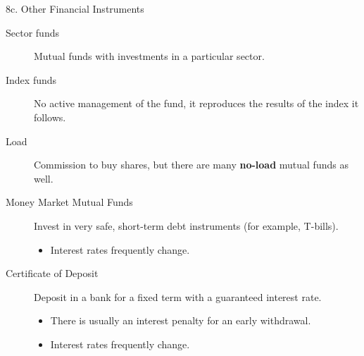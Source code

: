 \begin{CHPT_SUMM_AUTO}[label = {L.-8c}]{8c. Other Financial Instruments}
\begin{description}
	\item[Sector funds]	Mutual funds with investments in a particular sector.
	\item[Index funds]	No active management of the fund, it reproduces the results of the index it follows.
	\item[Load]	Commission to buy shares, but there are many \textbf{no-load} mutual funds as well.
	\item[Money Market Mutual Funds]	Invest in very safe, short-term debt instruments (for example, T-bills).
		\begin{itemize}[leftmargin = *]
		\item	Interest rates frequently change.
		\end{itemize}
	\item[Certificate of Deposit]	Deposit in a bank for a fixed term with a guaranteed interest rate.
		\begin{itemize}[leftmargin = *]
		\item	There is usually an interest penalty for an early withdrawal.
		\item	Interest rates frequently change.
		\end{itemize}
\end{description}
\end{CHPT_SUMM_AUTO}

